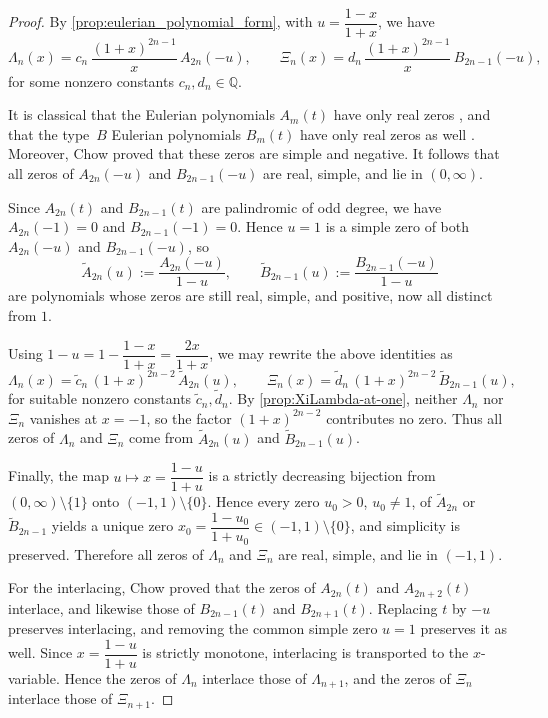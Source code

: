 \documentclass[11pt,twoside]{article}
\numberwithin{equation}{section}
\begin{document}
\begin{proof}
By \cref{prop:eulerian_polynomial_form}, with \(u=\dfrac{1-x}{1+x}\), we have
\[
\Lambda_n(x)=c_n\,\dfrac{(1+x)^{2n-1}}{x}\,A_{2n}(-u),
\qquad
\Xi_n(x)=d_n\,\dfrac{(1+x)^{2n-1}}{x}\,B_{2n-1}(-u),
\]
for some nonzero constants \(c_n,d_n\in\mathbb Q\).

It is classical that the Eulerian polynomials \(A_m(t)\) have only real zeros
\cite{Frobenius1910BernoulliEuler,Janson2013EulerFrobenius,VisontaiWilliams2013StableWEulerian},
and that the type~\(B\) Eulerian polynomials \(B_m(t)\) have only real zeros as well
\cite{Brenti1994,VisontaiWilliams2013StableWEulerian}. Moreover, Chow
\cite{Chow2024InterlacingEulerianIII} proved that these zeros are simple and negative.
It follows that all zeros of \(A_{2n}(-u)\) and \(B_{2n-1}(-u)\) are real, simple, and lie in \((0,\infty)\).

Since \(A_{2n}(t)\) and \(B_{2n-1}(t)\) are palindromic of odd degree, we have
\(A_{2n}(-1)=0\) and \(B_{2n-1}(-1)=0\). Hence \(u=1\) is a simple zero of both \(A_{2n}(-u)\) and \(B_{2n-1}(-u)\), so
\[
\widetilde A_{2n}(u):=\dfrac{A_{2n}(-u)}{1-u},
\qquad
\widetilde B_{2n-1}(u):=\dfrac{B_{2n-1}(-u)}{1-u}
\]
are polynomials whose zeros are still real, simple, and positive, now all distinct from \(1\).

Using \(1-u=1-\dfrac{1-x}{1+x}=\dfrac{2x}{1+x}\), we may rewrite the above identities as
\[
\Lambda_n(x)=\tilde c_n\,(1+x)^{2n-2}\,\widetilde A_{2n}(u),
\qquad
\Xi_n(x)=\tilde d_n\,(1+x)^{2n-2}\,\widetilde B_{2n-1}(u),
\]
for suitable nonzero constants \(\tilde c_n,\tilde d_n\). By \cref{prop:XiLambda-at-one}, neither \(\Lambda_n\) nor \(\Xi_n\) vanishes at \(x=-1\), so the factor \((1+x)^{2n-2}\) contributes no zero. Thus all zeros of \(\Lambda_n\) and \(\Xi_n\) come from \(\widetilde A_{2n}(u)\) and \(\widetilde B_{2n-1}(u)\).

Finally, the map \(u\mapsto x=\dfrac{1-u}{1+u}\) is a strictly decreasing bijection from \((0,\infty)\setminus\{1\}\) onto \((-1,1)\setminus\{0\}\). Hence every zero \(u_0>0\), \(u_0\neq 1\), of \(\widetilde A_{2n}\) or \(\widetilde B_{2n-1}\) yields a unique zero \(x_0=\dfrac{1-u_0}{1+u_0}\in(-1,1)\setminus\{0\}\), and simplicity is preserved. Therefore all zeros of \(\Lambda_n\) and \(\Xi_n\) are real, simple, and lie in \((-1,1)\).

For the interlacing, Chow \cite{Chow2024InterlacingEulerianIII} proved that the zeros of \(A_{2n}(t)\) and \(A_{2n+2}(t)\) interlace, and likewise those of \(B_{2n-1}(t)\) and \(B_{2n+1}(t)\). Replacing \(t\) by \(-u\) preserves interlacing, and removing the common simple zero \(u=1\) preserves it as well. Since \(x=\dfrac{1-u}{1+u}\) is strictly monotone, interlacing is transported to the \(x\)-variable. Hence the zeros of \(\Lambda_n\) interlace those of \(\Lambda_{n+1}\), and the zeros of \(\Xi_n\) interlace those of \(\Xi_{n+1}\).
\end{proof}
\end{document}
